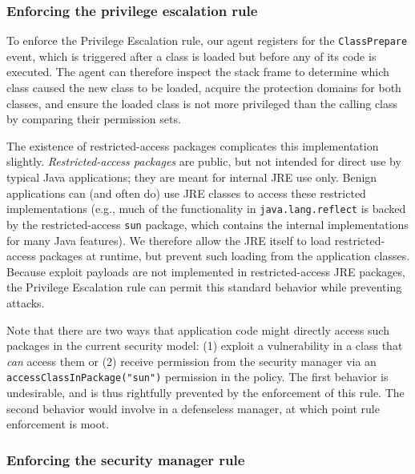 \documentclass{sig-alternate}
\begin{document}
\subsubsection{Enforcing the privilege escalation rule}\label{sub:Enforcing-the-Privilege}


To enforce the Privilege Escalation rule, our agent registers for
the \texttt{ClassPrepare} event, which is triggered after a class is loaded but
before any of its code is executed.  The agent can therefore 
inspect the stack frame to determine which class
caused the new class to be loaded, acquire the protection
domains for both classes, and ensure the loaded class is not more privileged
than the calling class by comparing their permission sets. 

The existence of restricted-access packages complicates this implementation slightly. 
\textit{Restricted-access packages} are public, but not intended for direct
use by typical Java applications; they are meant for internal JRE
use only. 
%
Benign applications can (and often do) use JRE classes to access these
restricted implementations (e.g., much of the functionality in \texttt{java.lang.reflect}
is backed by the restricted-access \texttt{sun} package, which
contains the internal implementations
for many Java features).  We therefore allow the JRE itself to load restricted-access packages
at runtime, but prevent such loading from the application classes.
Because exploit payloads are not implemented in restricted-access JRE packages,
the Privilege Escalation rule can permit this standard behavior while preventing
attacks.  

Note that there are two ways that application code might directly access such
packages in the current security model: 
(1) exploit a vulnerability in a class that \emph{can} access them or (2)
receive permission from the security manager via an
\texttt{accessClassInPackage("sun")} permission in the policy.  The first behavior
is undesirable, and is thus rightfully prevented by the enforcement of this
rule.  The second behavior would involve in a defenseless manager, at which
point rule enforcement is moot.


\subsubsection{Enforcing the security manager rule}\label{sub:Enforcing-the-SecurityManager}
\end{document}
